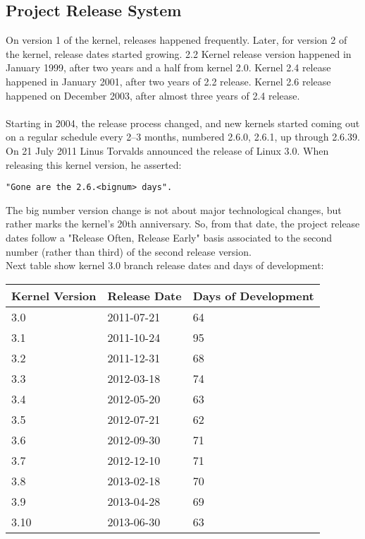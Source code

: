 \documentclass[11pt]{article}
\begin{document}
\subsection{Project Release System}
On version 1 of the kernel, releases happened frequently. Later, for version 2 of the kernel, release dates started growing. 2.2 Kernel release version happened in January 1999, after two years and a half from kernel 2.0. Kernel 2.4 release happened in January 2001, after two years of 2.2 release. Kernel 2.6 release happened on December 2003, after almost three years of 2.4 release.\\
\\
Starting in 2004, the release process changed, and new kernels started coming out on a regular schedule every 2–3 months, numbered 2.6.0, 2.6.1, up through 2.6.39. On 21 July 2011 Linus Torvalds announced the release of Linux 3.0. When releasing this kernel version, he asserted:
\begin{verbatim}
"Gone are the 2.6.<bignum> days".
\end{verbatim}
The big number version change  is not about major technological changes, but rather marks the kernel's 20th anniversary. So, from that date, the project release dates follow a "Release Often, Release Early" basis associated to the second number (rather than third) of the second release version.\\
Next table show kernel 3.0 branch release dates and days of development:
\begin{center}
    \begin{tabular}{ | l | l | l | }
    \hline
    Kernel Version & Release Date & Days of Development\\
    \hline
    3.0  & 2011-07-21 & 64\\
    3.1  & 2011-10-24 & 95\\
    3.2  & 2011-12-31 & 68\\
    3.3  & 2012-03-18 & 74\\
    3.4  & 2012-05-20 & 63\\
    3.5  & 2012-07-21 & 62\\
    3.6  & 2012-09-30 & 71\\
    3.7  & 2012-12-10 & 71\\
    3.8  & 2013-02-18 & 70\\
    3.9  & 2013-04-28 & 69\\
    3.10 & 2013-06-30 & 63\\
    \hline
    \end{tabular}
\end{center}
\end{document}
